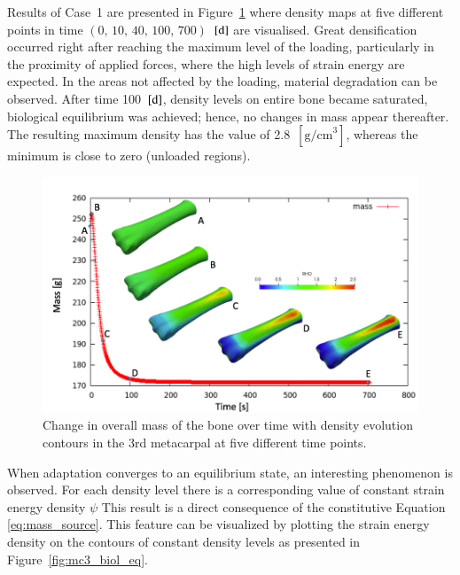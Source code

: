 \documentclass[11pt]{acmeArticle}
\numberwithin{equation}{section}
\begin{document}
Results of Case~1 are presented in Figure~\ref{fig:mc3_density} where density maps at five different points in time $(\text{0, 10, 40, 100, 700})$~$[\text d]$ are visualised. 
Great densification occurred right after reaching the maximum level of the loading, particularly in the proximity of applied forces, where the high levels of strain energy are expected. 
In the areas not affected by the loading, material degradation can be observed. 
After time 100~$[{\text d}]$, density levels on entire bone became saturated, biological equilibrium was achieved; hence, no changes in mass appear thereafter. 
The resulting maximum density has the value of 2.8~$[{\text {g/cm}}^3]$, whereas the minimum is close to zero (unloaded regions).
\begin{figure}[h!]
	\begin{centering}
		\includegraphics[width=15cm]{Figures/graphs/mc3_density.png}
		\caption{Change in overall mass of the bone over time with density evolution contours in the 3rd metacarpal at five different time points.}
		\label{fig:mc3_density}
	\end{centering}
\end{figure}
When adaptation converges to an equilibrium state, an interesting phenomenon is observed.
For each density level there is a corresponding value of constant strain energy density $\psi$
This result is a direct consequence of the constitutive Equation \ref{eq:mass_source}. 
This feature can be visualized by plotting the strain energy density on the contours of constant density levels as presented in Figure~\ref{fig:mc3_biol_eq}. 
\end{document}
